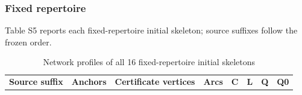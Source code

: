 \documentclass[pdflatex,sn-basic,Numbered]{sn-jnl}
\begin{document}
\subsubsection*{Fixed repertoire}\label{fixed-repertoire}

Table S5 reports each fixed-repertoire initial skeleton; source suffixes follow the frozen order.

\begingroup
\small
\setlength{\tabcolsep}{3pt}
\renewcommand{\arraystretch}{1.13}

\begin{longtable}[]{@{}
  >{\raggedright\arraybackslash}p{}
  >{\raggedleft\arraybackslash}p{}
  >{\raggedleft\arraybackslash}p{}
  >{\raggedleft\arraybackslash}p{}
  >{\raggedleft\arraybackslash}p{}
  >{\raggedleft\arraybackslash}p{}
  >{\raggedleft\arraybackslash}p{}
  >{\raggedleft\arraybackslash}p{}@{}}
\caption{Network profiles of all 16 fixed-repertoire initial skeletons}\label{tab:39}\tabularnewline
\toprule\noalign{}
\begin{minipage}[b]{\linewidth}\raggedright
\textbf{Source suffix}
\end{minipage} & \begin{minipage}[b]{\linewidth}\raggedleft
\textbf{Anchors}
\end{minipage} & \begin{minipage}[b]{\linewidth}\raggedleft
\textbf{Certificate vertices}
\end{minipage} & \begin{minipage}[b]{\linewidth}\raggedleft
\textbf{Arcs}
\end{minipage} & \begin{minipage}[b]{\linewidth}\raggedleft
\textbf{C}
\end{minipage} & \begin{minipage}[b]{\linewidth}\raggedleft
\textbf{L}
\end{minipage} & \begin{minipage}[b]{\linewidth}\raggedleft
\textbf{Q}
\end{minipage} & \begin{minipage}[b]{\linewidth}\raggedleft
\textbf{Q0}
\end{minipage} \\

\end{longtable}
\end{document}
